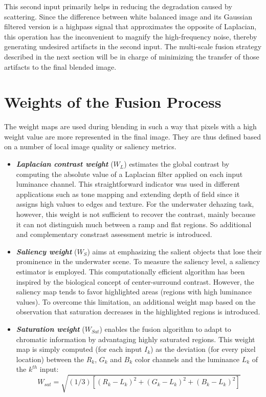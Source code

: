 \documentclass[hidelinks, 12pt]{report}
\begin{document}
This second input primarily helps in reducing the degradation caused by scattering. Since the difference between white balanced image and its Gaussian filtered version is a highpass signal that approximates the opposite of Laplacian, this operation has the inconvenient to magnify the high-frequency noise, thereby generating undesired artifacts in the second input. The multi-scale fusion strategy described in the next section will be in charge of minimizing the transfer of those artifacts to the final blended image.

\section{Weights of the Fusion Process}
The weight maps are used during blending in such a way that pixels with a high weight value are more represented in the final image. They are thus defined based on a number of local image quality or saliency metrics.
\begin{itemize}
\item{\textbf{\textit{Laplacian contrast weight}} ($W_L$) estimates the global contrast by computing the absolute value of a Laplacian filter applied on each input luminance channel. This straightforward indicator was used in different applications such as tone mapping and extending depth of field since it assigns high values to edges and texture. For the underwater dehazing task, however, this weight is not sufficient to recover the contrast, mainly because it can not distinguish much between a ramp and flat regions. So additional and complementary constrast assessment metric is introduced.}
\item{\textbf{\textit{Saliency weight}} ($W_S$) aims at emphasizing the salient objects that lose their prominence in the underwater scene. To measure the saliency level, a saliency estimator is employed. This computationally efficient algorithm has been inspired by the biological concept of center-surround contrast. However, the saliency map tends to favor highlighted areas (regions with high luminance values). To overcome this limitation, an additional weight map based on the observation that saturation decreases in the highlighted regions is introduced.}
\item{\textbf{\textit{Saturation weight}} ($W_{Sat}$) enables the fusion algorithm to adapt to chromatic information by advantaging highly saturated regions. This weight map is simply computed (for each input $I_k$) as the deviation (for every pixel location) between the $R_k$, $G_k$ and $B_k$ color channels and the luminance $L_k$ of the $k^{th}$ input:
\begin{equation}
W_{sat}=\sqrt{(1/3)[(R_k-L_k)^2+(G_k-L_k)^2+(B_k-L_k)^2]}
\end{equation}
}
\end{itemize}
\end{document}
